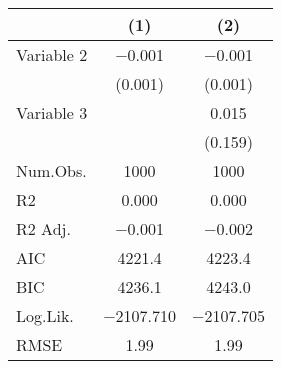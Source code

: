 \begin{table}
\centering
\begin{tabular}[t]{lcc}
\toprule
  & (1) & (2)\\
\midrule
Variable 2 & \num{-0.001} & \num{-0.001}\\
 & (\num{0.001}) & (\num{0.001})\\
Variable 3 &  & \num{0.015}\\
 &  & (\num{0.159})\\
\midrule
Num.Obs. & \num{1000} & \num{1000}\\
R2 & \num{0.000} & \num{0.000}\\
R2 Adj. & \num{-0.001} & \num{-0.002}\\
AIC & \num{4221.4} & \num{4223.4}\\
BIC & \num{4236.1} & \num{4243.0}\\
Log.Lik. & \num{-2107.710} & \num{-2107.705}\\
RMSE & \num{1.99} & \num{1.99}\\
\bottomrule
\end{tabular}
\end{table}
